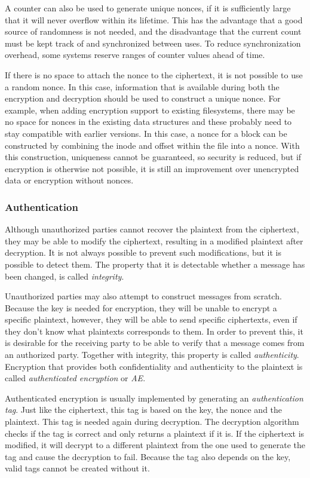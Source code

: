 A counter can also be used to generate unique nonces, if it is sufficiently
large that it will never overflow within its lifetime. This has the advantage
that a good source of randomness is not needed, and the disadvantage that the
current count must be kept track of and synchronized between uses. To reduce
synchronization overhead, some systems reserve ranges of counter values ahead of
time.

If there is no space to attach the nonce to the ciphertext, it is not possible
to use a random nonce. In this case, information that is available during both
the encryption and decryption should be used to construct a unique nonce. For
example, when adding encryption support to existing filesystems, there may be no
space for nonces in the existing data structures and these probably need to stay
compatible with earlier versions. In this case, a nonce for a block can be
constructed by combining the inode and offset within the file into a nonce. With
this construction, uniqueness cannot be guaranteed, so security is reduced, but
if encryption is otherwise not possible, it is still an improvement over
unencrypted data or encryption without nonces.

\subsubsection{Authentication}

Although unauthorized parties cannot recover the plaintext from the ciphertext,
they may be able to modify the ciphertext, resulting in a modified plaintext
after decryption. It is not always possible to prevent such modifications, but
it is possible to detect them. The property that it is detectable whether a
message has been changed, is called \emph{integrity}.

Unauthorized parties may also attempt to construct messages from scratch.
Because the key is needed for encryption, they will be unable to encrypt a
specific plaintext, however, they will be able to send specific ciphertexts,
even if they don't know what plaintexts corresponds to them. In order to prevent
this, it is desirable for the receiving party to be able to verify that a
message comes from an authorized party. Together with integrity, this property
is called \emph{authenticity}. Encryption that provides both confidentiality and
authenticity to the plaintext is called \emph{authenticated encryption} or
\emph{AE}.

Authenticated encryption is usually implemented by generating an
\emph{authentication tag}. Just like the ciphertext, this tag is based on the
key, the nonce and the plaintext. This tag is needed again during decryption.
The decryption algorithm checks if the tag is correct and only returns a
plaintext if it is. If the ciphertext is modified, it will decrypt to a
different plaintext from the one used to generate the tag and cause the
decryption to fail. Because the tag also depends on the key, valid tags cannot
be created without it.

